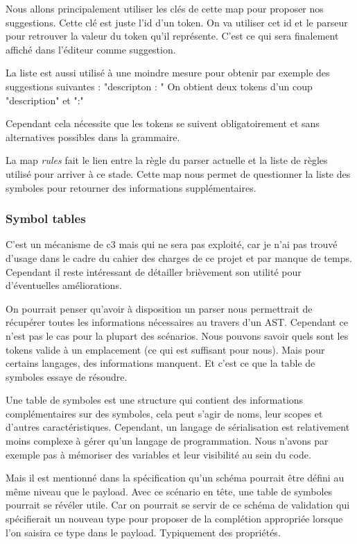 \documentclass[
    iict, %
    il, %
]{heig-tb}
\begin{document}
Nous allons principalement utiliser les clés de cette map pour proposer nos suggestions.
Cette clé est juste l'id d'un token. On va utiliser cet id et le parseur pour retrouver la valeur du token qu'il représente. C'est ce qui sera finalement affiché dans l'éditeur comme suggestion.

La liste est aussi utilisé à une moindre mesure pour obtenir par exemple des suggestions suivantes : "descripton : "
On obtient deux tokens d'un coup "description" et ":"

Cependant cela nécessite que les tokens se suivent obligatoirement et sans alternatives possibles dans la grammaire.

La map \emph{rules} fait le lien entre la règle du parser actuelle et la liste de règles utilisé pour arriver à ce stade.
Cette map nous permet de questionner la liste des symboles pour retourner des informations supplémentaires.

\subsubsection{Symbol tables}\label{Symbol tables}

C'est un mécanisme de c3 mais qui ne sera pas exploité, car je n'ai pas trouvé d'usage dans le cadre du cahier des charges de ce projet et par manque de temps.
Cependant il reste intéressant de détailler brièvement son utilité pour d'éventuelles améliorations.

On pourrait penser qu'avoir à disposition un parser nous permettrait de récupérer toutes les informations nécessaires au travers d'un AST.
Cependant ce n'est pas le cas pour la plupart des scénarios.
Nous pouvons savoir quels sont les tokens valide à un emplacement (ce qui est suffisant pour nous). Mais pour certains langages, des informations manquent.
Et c'est ce que la table de symboles essaye de résoudre.

Une table de symboles est une structure qui contient des informations complémentaires sur des symboles, cela peut s'agir de noms, leur scopes et d'autres caractéristiques.
Cependant, un langage de sérialisation est relativement moins complexe à gérer qu'un langage de programmation.
Nous n'avons par exemple pas à mémoriser des variables et leur visibilité au sein du code.

Mais il est mentionné dans la spécification qu'un schéma pourrait être défini au même niveau que le payload.
Avec ce scénario en tête, une table de symboles pourrait se révéler utile. Car on pourrait se servir de ce schéma de validation qui spécifierait un nouveau type pour proposer de la complétion appropriée
lorsque l'on saisira ce type dans le payload. Typiquement des propriétés.
\end{document}
